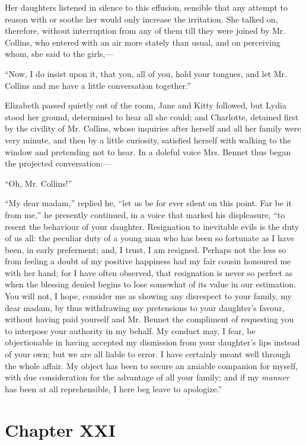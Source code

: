 \documentclass[12pt,openright]{book}
\begin{document}
Her daughters listened in silence to this effusion, sensible that any attempt to reason with or soothe her would only increase the irritation. She talked on, therefore, without interruption from any of them till they were joined by Mr. Collins, who entered with an air more stately than usual, and on perceiving whom, she said to the girls,—

“Now, I do insist upon it, that you, all of you, hold your tongues, and let Mr. Collins and me have a little conversation together.”

Elizabeth passed quietly out of the room, Jane and Kitty followed, but Lydia stood her ground, determined to hear all she could; and Charlotte, detained first by the civility of Mr. Collins, whose inquiries after herself and all her family were very minute, and then by a little curiosity, satisfied herself with walking to the window and pretending not to hear. In a doleful voice Mrs. Bennet thus began the projected conversation:—

“Oh, Mr. Collins!”

“My dear madam,” replied he, “let us be for ever silent on this point. Far be it from me,” he presently continued, in a voice that marked his displeasure, “to resent the behaviour of your daughter. Resignation to inevitable evils is the duty of us all: the peculiar duty of a young man who has been so fortunate as I have been, in early preferment; and, I trust, I am resigned. Perhaps not the less so from feeling a doubt of my positive happiness had my fair cousin honoured me with her hand; for I have often observed, that resignation is never so perfect as when the blessing denied begins to lose somewhat of its value in our estimation. You will not, I hope, consider me as showing any disrespect to your family, my dear madam, by thus withdrawing my pretensions to your daughter’s favour, without having paid yourself and Mr. Bennet the compliment of requesting you to interpose your authority in my behalf. My conduct may, I fear, be objectionable in having accepted my dismission from your daughter’s lips instead of your own; but we are all liable to error. I have certainly meant well through the whole affair. My object has been to secure an amiable companion for myself, with due consideration for the advantage of all your family; and if my \textit{manner} has been at all reprehensible, I here beg leave to apologize.”

\chapter{Chapter XXI}
\end{document}

